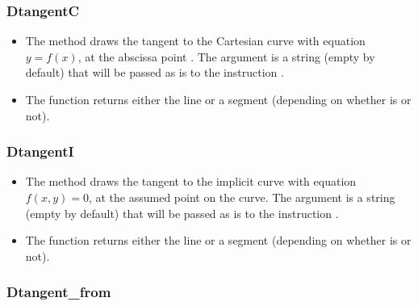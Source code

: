 \subsubsection{DtangentC}
\begin{itemize}
    \item The method  draws the tangent to the Cartesian curve with equation \(y=f(x)\), at the abscissa point . \arguLong{} The argument  is a string (empty by default) that will be passed as is to the instruction \drawcmd.
    \item The function  returns either the line or a segment (depending on whether  is \nil or not).
\end{itemize}

\subsubsection{DtangentI}
\begin{itemize}
    \item The method  draws the tangent to the implicit curve with equation \(f(x,y)=0\), at the assumed point  on the curve. \arguLong{} The argument  is a string (empty by default) that will be passed as is to the instruction \drawcmd.
    \item The function  returns either the line or a segment (depending on whether  is \nil or not).
\end{itemize}


\subsubsection{Dtangent\_from}

